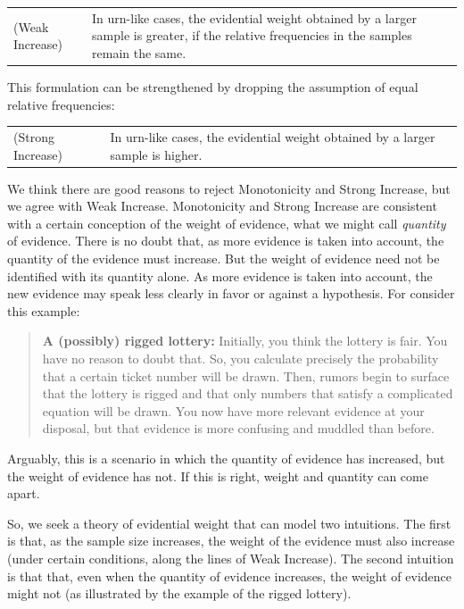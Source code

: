 \documentclass[
  10pt,
  dvipsnames,enabledeprecatedfontcommands]{scrartcl}
\begin{document}
\vspace{1mm}
\begin{tabular}{lp{10cm}}
(Weak Increase) & In urn-like cases, the evidential weight obtained by a larger sample is greater, if the relative frequencies in the samples remain the same.
\end{tabular}
\vspace{1mm}

\noindent This formulation can be strengthened by dropping the
assumption of equal relative frequencies:

\vspace{1mm}
\begin{tabular}{lp{11cm}}
(Strong Increase) & In urn-like cases, the evidential weight obtained by a larger sample is higher.
\end{tabular}

\noindent We think there are good reasons to reject Monotonicity and
Strong Increase, but we agree with Weak Increase. Monotonicity and
Strong Increase are consistent with a certain conception of the weight
of evidence, what we might call \emph{quantity} of evidence. There is no
doubt that, as more evidence is taken into account, the quantity of the
evidence must increase. But the weight of evidence need not be
identified with its quantity alone. As more evidence is taken into
account, the new evidence may speak less clearly in favor or against a
hypothesis. For consider this example:

\begin{quote}
\textbf{A (possibly) rigged lottery:} Initially, you think the lottery  is  fair. You have no reason to doubt that. So, you calculate precisely the probability that a certain ticket number will be drawn. Then, rumors begin to surface that the lottery is rigged and that only numbers that satisfy a complicated equation will be drawn. You now have more relevant evidence at your disposal, but that evidence is more confusing and muddled than before. 
\end{quote}

\noindent Arguably, this is a scenario in which the quantity of evidence
has increased, but the weight of evidence has not. If this is right,
weight and quantity can come apart.

So, we seek a theory of evidential weight that can model two intuitions.
The first is that, as the sample size increases, the weight of the
evidence must also increase (under certain conditions, along the lines
of Weak Increase). The second intuition is that that, even when the
quantity of evidence increases, the weight of evidence might not (as
illustrated by the example of the rigged lottery).
\end{document}

